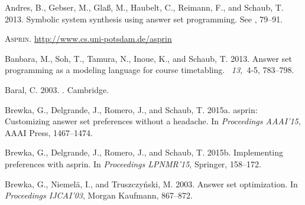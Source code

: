 \begin{thebibliography}{}

{\sc Andres, B.}, {\sc Gebser, M.}, {\sc Gla{\ss}, M.}, {\sc Haubelt, C.}, {\sc Reimann, F.}, {\sc and} {\sc Schaub, T.} 2013.
\newblock Symbolic system synthesis using answer set programming.
\newblock See , 79--91.

\textsc{Asprin}. \url{http://www.cs.uni-potsdam.de/asprin}

{\sc Banbara, M.}, {\sc Soh, T.}, {\sc Tamura, N.}, {\sc Inoue, K.}, {\sc and} {\sc Schaub, T.} 2013.
\newblock Answer set programming as a modeling language for course timetabling.
~{\em 13,\/}~4-5, 783--798.

{\sc Baral, C.} 2003.
.
\newblock Cambridge.

{\sc Brewka, G.}, {\sc Delgrande, J.}, {\sc Romero, J.}, {\sc and} {\sc Schaub, T.} 2015a.
\newblock asprin: Customizing answer set preferences without a headache.
\newblock In {\em Proceedings AAAI'15},
AAAI Press, 1467--1474.

{\sc Brewka, G.}, {\sc Delgrande, J.}, {\sc Romero, J.}, {\sc and} {\sc Schaub, T.} 2015b.
\newblock Implementing preferences with asprin.
\newblock In {\em Proceedings LPNMR'15},
Springer, 158--172.

{\sc Brewka, G.}, {\sc Niemelä, I.}, {\sc and} {\sc Truszczy{\'n}ski, M.} 2003.
\newblock Answer set optimization.
\newblock In {\em Proceedings IJCAI'03},
Morgan Kaufmann, 867--872.


\end{thebibliography}
